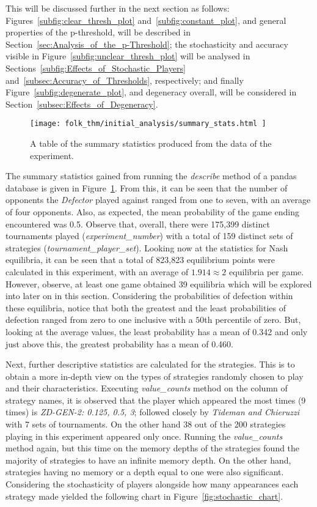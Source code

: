 This will be discussed further in the next section as follows:
Figures~\ref{subfig:clear_thresh_plot} and~\ref{subfig:constant_plot}, and
general properties of the p-threshold, will be described in
Section~\ref{sec:Analysis_of_the_p-Threshold}; the stochasticity and accuracy
visible in Figure~\ref{subfig:unclear_thresh_plot} will be analysed in
Sections~\ref{subfig:Effects_of_Stochastic_Players}
and~\ref{subsec:Accuracy_of_Thresholds}, respectively; and finally
Figure~\ref{subfig:degenerate_plot}, and degeneracy overall, will be considered
in Section~\ref{subsec:Effects_of_Degeneracy}.

\begin{figure}
    \centering
    \texttt{[image: folk\_thm/initial\_analysis/summary\_stats.html
    ]}
    \caption{A table of the summary statistics produced from the data of the experiment.}\label{fig:summary_stats}
\end{figure}

The summary statistics gained from running the \textit{describe} method of a
pandas database is given in Figure~\ref{fig:summary_stats}. From this, it can be
seen that the number of opponents the \textit{Defector} played against ranged
from one to seven, with an average of four opponents. Also, as expected, the
mean probability of the game ending encountered was 0.5. Observe that, overall,
there were 175,399 distinct tournaments played (\textit{experiment_number}) with
a total of 159 distinct sets of strategies (\textit{tournament_player_set}).
Looking now at the statistics for Nash equilibria, it can be seen that a total
of 823,823 equilibrium points were calculated in this experiment, with an
average of \(1.914 \approx 2\) equilibria per game. However, observe, at least
one game obtained 39 equilibria which will be explored into later on in this
section. Considering the probabilities of defection within these equilibria,
notice that both the greatest and the least probabilities of defection ranged
from zero to one inclusive with a \(50\)th percentile of zero. But, looking at
the average values, the least probability has a mean of 0.342 and only just
above this, the greatest probability has a mean of 0.460.

Next, further descriptive statistics are calculated for the strategies. This is
to obtain a more in-depth view on the types of strategies randomly chosen to
play and their characteristics. Executing \textit{value_counts} method on the
column of strategy names, it is observed that the player which appeared the most
times (9 times) is \textit{ZD-GEN-2: 0.125, 0.5, 3}; followed closely by
\textit{Tideman and Chieruzzi} with 7 sets of tournaments. On the other hand 38
out of the 200 strategies playing in this experiment appeared only once.
Running the \textit{value_counts} method again, but this time on the memory
depths of the strategies found the majority of strategies to have an infinite
memory depth. On the other hand, strategies having no memory or a depth equal to
one were also significant. Considering the stochasticity of players alongside
how many appearances each strategy made yielded the following chart in
Figure~\ref{fig:stochastic_chart}.

